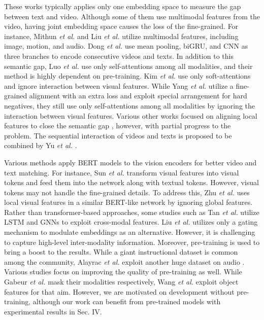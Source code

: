 \documentclass[lettersize,journal]{IEEEtran}
\begin{document}
These works \cite{miech20endtoend,Rouditchenko2021AVLnetLA} typically applies only one embedding space to measure the gap between text and video. Although some of them use multimodal features from the video, having joint embedding space causes the loss of the fine-grained. For instance, Mithun \textit{et al.} \cite{mithun2020} and Liu \textit{et al.} \cite{Liu2019a}  utilize multimodal features, including image, motion, and audio. Dong \textit{et al.} \cite{dong_cvpr19} use mean pooling, biGRU, and CNN as three branches to encode consecutive videos and texts. In addition to this semantic gap, Luo \textit{et al.} \cite{Luo2020UniVL} use only self-attentions among all modalities, and their method is highly dependent on pre-training. Kim \textit{et al.} \cite{swamp} use only soft-attentions and ignore interaction between visual features. While Yang \textit{et al.} \cite{taco} utilize a fine-grained alignment with an extra loss and exploit special arrangement for hard negatives, they still use only self-attentions among all modalities by ignoring the interaction between visual features. Various other works focused on aligning local features to close the semantic gap \cite{song2019polysemous, Yu_2018_ECCV}, however, with partial progress to the problem. The sequential interaction of videos and texts is proposed to be combined by Yu \textit{et al.} \cite{Yu_2018_ECCV}.

Various methods \cite{videobert, Zhu_2020_Actbert, wang-etal-2020-vd} apply BERT models to the vision encoders for better video and text matching. For instance, Sun \textit{et al.} \cite{videobert} transform visual features into visual tokens and feed them into the network along with textual tokens. However, visual tokens may not handle the fine-grained details. To address this, Zhu \textit{et al.} \cite{Zhu_2020_Actbert} uses local visual features in a similar BERT-like network by ignoring global features. Rather than transformer-based approaches, some studies such as Tan \textit{et al.} \cite{tan2020wman} utilize LSTM and GNNs to exploit cross-modal features. Liu \textit{et al.} \cite{Liu2019a} utilizes only a gating mechanism to modulate embeddings as an alternative. However, it is challenging to capture high-level inter-modality information. Moreover, pre-training is used to bring a boost to the results. While a giant instructional dataset \cite{miech19howto100m} is common among the community, Alayrac \textit{et al.} \cite{alayrac2020selfsupervised} exploit another huge dataset on audio \cite{audioset}. Various studies focus on improving the quality of pre-training as well. While Gabeur \textit{et al.} \cite{mask_gabeur} mask their modalities respectively, Wang \textit{et al.} \cite{wang_object_pretraining} exploit object features for that aim. However, we are motivated on development without pre-training, although our work can benefit from pre-trained models with experimental results in Sec. IV.  
\end{document}
